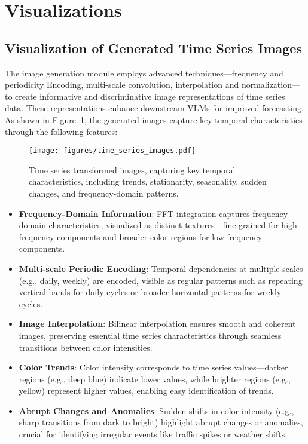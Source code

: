 \section{Visualizations}
\label{appx:visualizations}

\subsection{Visualization of Generated Time Series Images}

The image generation module employs advanced techniques—frequency and periodicity Encoding, multi-scale convolution, interpolation and normalization—to create informative and discriminative image representations of time series data. These representations enhance downstream VLMs for improved forecasting. As shown in Figure~\ref{fig:time_series_images}, the generated images capture key temporal characteristics through the following features:

\begin{figure}[h!]
    \centering
    \texttt{[image: figures/time\_series\_images.pdf]}
    \caption{Time series transformed images, capturing key temporal characteristics, including trends, stationarity, seasonality, sudden changes, and frequency-domain patterns.}
    \label{fig:time_series_images}
\end{figure}

\begin{itemize}[leftmargin=*, itemsep=0pt]
    \item \textbf{Frequency-Domain Information}: FFT integration captures frequency-domain characteristics, visualized as distinct textures—fine-grained for high-frequency components and broader color regions for low-frequency components.

    \item \textbf{Multi-scale Periodic Encoding}: Temporal dependencies at multiple scales (e.g., daily, weekly) are encoded, visible as regular patterns such as repeating vertical bands for daily cycles or broader horizontal patterns for weekly cycles.
    
    \item \textbf{Image Interpolation}: Bilinear interpolation ensures smooth and coherent images, preserving essential time series characteristics through seamless transitions between color intensities.

    \item \textbf{Color Trends}: Color intensity corresponds to time series values—darker regions (e.g., deep blue) indicate lower values, while brighter regions (e.g., yellow) represent higher values, enabling easy identification of trends.

    \item \textbf{Abrupt Changes and Anomalies}: Sudden shifts in color intensity (e.g., sharp transitions from dark to bright) highlight abrupt changes or anomalies, crucial for identifying irregular events like traffic spikes or weather shifts.
\end{itemize}    


